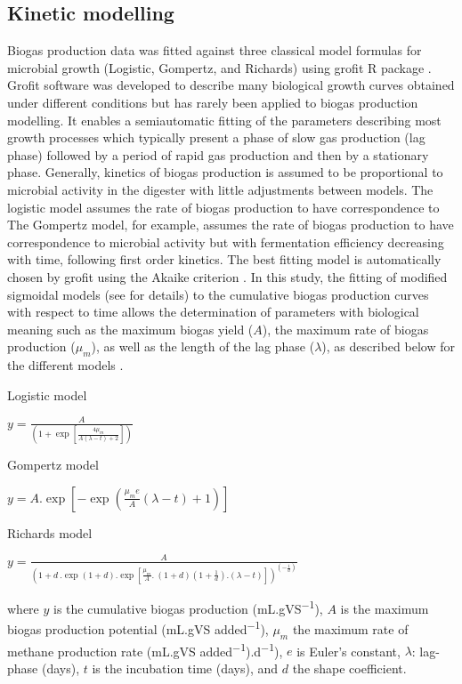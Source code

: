 \subsection{Kinetic modelling}
Biogas production data was fitted against three classical model formulas for microbial growth (Logistic, Gompertz, and Richards) using grofit R package \cite{Kahm_2010}. Grofit software was developed to describe many biological growth curves obtained under different conditions but has rarely been applied to biogas production modelling. It enables a semiautomatic fitting of the parameters describing most growth processes which typically present a phase of slow gas production (lag phase) followed by a period of rapid gas production and then by a stationary phase. Generally, kinetics of biogas production is assumed to be proportional to microbial activity in the digester with little adjustments between models. The logistic model assumes the rate of biogas production to have correspondence to  The Gompertz model, for example, assumes the rate of biogas production to have correspondence to microbial activity but with fermentation efficiency decreasing with time, following first order kinetics. The best fitting model is automatically chosen by grofit using the Akaike criterion \cite{Hasenbrink_2006}. In this study, the fitting of modified sigmoidal models (see \cite{Zwietering1990} for details) to the cumulative biogas production curves with respect to time allows the determination of parameters with biological meaning such as the maximum biogas yield ($A$), the maximum rate of biogas production ($μ_m$), as well as the length of the lag phase ($λ$), as described below for the different models \cite{Zwietering1990,Ware_2017,Alta__2009}.

Logistic model

\(y=\frac{A}{\left(1+\exp\left[\frac{4\mu_m}{A\left(\lambda-t\right)+2}\right]\right)}\)

Gompertz model

\(y=A.\exp\left[-\exp\left(\frac{\mu_me}{A}\left(\lambda-t\right)+1\right)\right]\)

Richards model

\(y=\frac{A}{\left(1+d\ .\exp\left(1+d\right).\exp\left[\frac{\mu_m}{A}.\ \left(1+d\right)\left(1+\frac{1}{d}\right).\left(\lambda-t\right)\right]\right)^{\left(-\frac{1}{d}\right)}}\)


where $y$ is the cumulative biogas production (mL.gVS\textsuperscript{−1}), $A$ is the maximum biogas production potential (mL.gVS added\textsuperscript{−1}), $μ_m$ the maximum rate of methane production rate (mL.gVS added\textsuperscript{−1}).d\textsuperscript{−1}), $e$ is Euler's constant, $λ$: lag-phase (days), $t$ is the incubation time (days), and $d$ the shape coefficient.